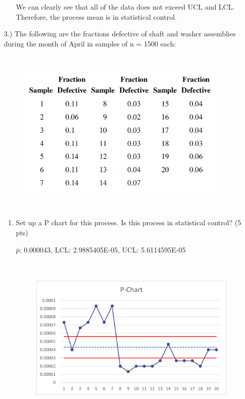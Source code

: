 \documentclass{article}
\begin{document}
\begin{enumerate}
\begin{enumerate}
        We can clearly see that all of the data does not exceed UCL and LCL. Therefore, the process mean is in statistical control. 

    \end{enumerate}

    \newpage
    
    \item[3.)] The following are the fractions defective of shaft and washer assemblies during the month of April in samples of n = 1500 each:
    \begin{figure}[!htbp]
        \centerline{\includegraphics[width=10cm,height=8cm,keepaspectratio]{Picture 2.png}}
    \end{figure}
    \begin{enumerate}
        \item Set up a P chart for this process. Is this process in statistical control? (5 pts)
        
        $\bar{p}$: 0.000043, LCL: 2.9885405E-05, UCL: 5.6114595E-05
        \begin{figure}[!htbp]
            \centerline{\includegraphics[width=10cm,height=8cm,keepaspectratio]{Picture 4.png}}
        \end{figure}


\end{enumerate}
\end{enumerate}
\end{document}
